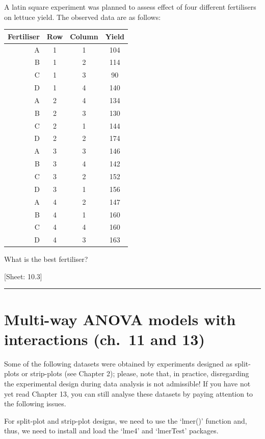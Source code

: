 \documentclass[a4paper,12pt,oneside]{book}
\begin{document}
A latin square experiment was planned to assess effect of four different fertilisers on lettuce yield. The observed data are as follows:

\begin{longtable}[]{@{}rccc@{}}
\toprule()
Fertiliser & Row & Column & Yield \\
\midrule()
\endhead
A & 1 & 1 & 104 \\
B & 1 & 2 & 114 \\
C & 1 & 3 & 90 \\
D & 1 & 4 & 140 \\
A & 2 & 4 & 134 \\
B & 2 & 3 & 130 \\
C & 2 & 1 & 144 \\
D & 2 & 2 & 174 \\
A & 3 & 3 & 146 \\
B & 3 & 4 & 142 \\
C & 3 & 2 & 152 \\
D & 3 & 1 & 156 \\
A & 4 & 2 & 147 \\
B & 4 & 1 & 160 \\
C & 4 & 4 & 160 \\
D & 4 & 3 & 163 \\
\bottomrule()
\end{longtable}

What is the best fertiliser?

{[}Sheet: 10.3{]}

\begin{center}\rule{0.5\linewidth}{0.5pt}\end{center}

\hypertarget{multi-way-anova-models-with-interactions-ch.-11-and-13}{%
\section{Multi-way ANOVA models with interactions (ch.~11 and 13)}\label{multi-way-anova-models-with-interactions-ch.-11-and-13}}

Some of the following datasets were obtained by experiments designed as split-plots or strip-plots (see Chapter 2); please, note that, in practice, disregarding the experimental design during data analysis is not admissible! If you have not yet read Chapter 13, you can still analyse these datasets by paying attention to the following issues.

For split-plot and strip-plot designs, we need to use the `lmer()' function and, thus, we need to install and load the `lme4' and `lmerTest' packages.
\end{document}
